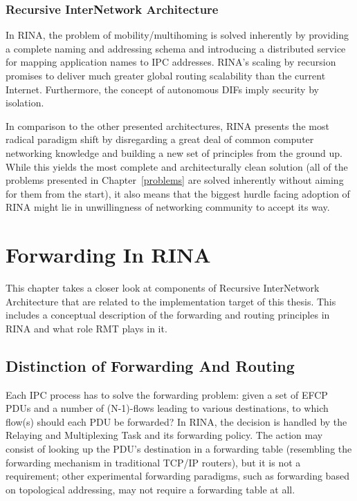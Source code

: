         \subsection{Recursive InterNetwork Architecture}

            In RINA, the problem of mobility/multihoming is solved inherently by providing a complete naming and addressing schema and introducing a distributed service for mapping application names to IPC addresses. RINA's scaling by recursion promises to deliver much greater global routing scalability than the current Internet. Furthermore, the concept of autonomous DIFs imply security by isolation.

            In comparison to the other presented architectures, RINA presents the most radical paradigm shift by disregarding a great deal of common computer networking knowledge and building a new set of principles from the ground up. While this yields the most complete and architecturally clean solution (all of the problems presented in Chapter~\ref{problems} are solved inherently without aiming for them from the start), it also means that the biggest hurdle facing adoption of RINA might lie in unwillingness of networking community to accept its way.


\chapter{Forwarding In RINA}\label{forwarding}

    This chapter takes a closer look at components of Recursive InterNetwork Architecture that are related to the implementation target of this thesis. This includes a conceptual description of the forwarding and routing principles in RINA and what role RMT plays in it.

    \section{Distinction of Forwarding And Routing}

        Each IPC process has to solve the forwarding problem: given a set of EFCP PDUs and a number of (N-1)-flows leading to various destinations, to which flow(s) should each PDU be forwarded? In RINA, the decision is handled by the Relaying and Multiplexing Task and its forwarding policy. The action may consist of looking up the PDU's destination in a forwarding table (resembling the forwarding mechanism in traditional TCP/IP routers), but it is not a requirement; other experimental forwarding paradigms, such as forwarding based on topological addressing, may not require a forwarding table at all.

